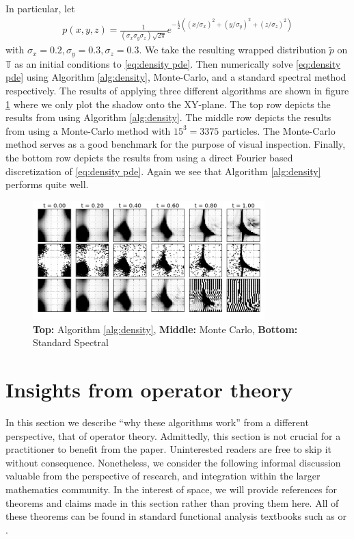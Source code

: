 \documentclass[12pt]{amsart}
\begin{document}
In particular, let
\begin{align}
	p(x,y,z) = \frac{1}{ (\sigma_{x} \sigma_{y} \sigma_{z} )\sqrt{ 2\pi } } e^{ - \frac{1}{2} ( (x/\sigma_{x})^{2} + (y/\sigma_{y})^{2} +  (z/\sigma_{z})^{2} )}
\end{align}
with $\sigma_{x} = 0.2, \sigma_{y} = 0.3, \sigma_{z} = 0.3$.
We take the resulting wrapped distribution $\tilde{p}$ on $\mathbb{T}$ as an initial conditions to \eqref{eq:density pde}.
Then numerically solve \eqref{eq:density pde} using Algorithm \ref{alg:density}, Monte-Carlo, and a standard spectral method respectively.
The results of applying three different algorithms are shown in figure \ref{fig:ABCD} where we only plot the shadow onto the XY-plane.
The top row depicts the results from using Algorithm \ref{alg:density}.
The middle row depicts the results from using a Monte-Carlo method with $15^{3} = 3375$ particles.
The Monte-Carlo method serves as a good benchmark for the purpose of visual inspection.
Finally, the bottom row depicts the results from using a direct Fourier based discretization of \eqref{eq:density pde}.
Again we see that Algorithm \ref{alg:density} performs quite well.


\begin{figure}
	\centering
	\includegraphics[width=0.8\textwidth]{./images/ABCD_flow.png}
	\caption{ \tiny {\bf Top:} Algorithm \ref{alg:density}, {\bf Middle:} Monte Carlo, {\bf Bottom:} Standard Spectral}
	\label{fig:ABCD}
\end{figure}


\section{Insights from operator theory}

In this section we describe ``why these algorithms work'' from a different perspective, that of operator theory.
Admittedly, this section is not crucial for a practitioner to benefit from the paper.
Uninterested readers are free to skip it without consequence.
Nonetheless, we consider the following informal discussion valuable from the perspective of research, and integration within the larger mathematics community.
In the interest of space, we will provide references for theorems and claims made in this section rather than proving them here.
All of these theorems can be found in standard functional analysis textbooks such as \cite{Conway1990} or \cite{Rudin1991}.
\end{document}
